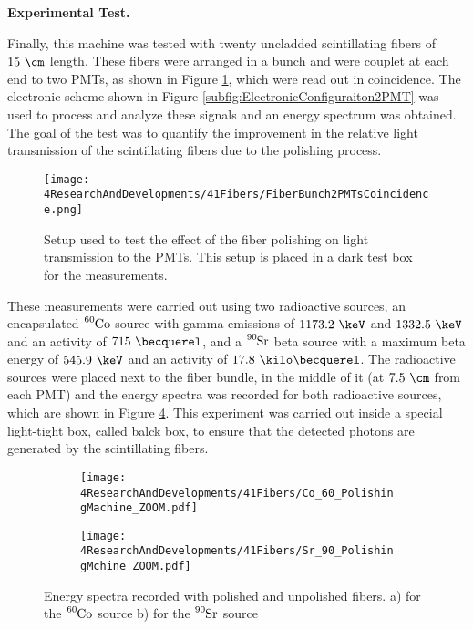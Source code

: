 \textbf{Experimental Test.}

Finally, this machine was tested with twenty uncladded scintillating fibers of $15~\cm$ length. These fibers were arranged in a bunch and were couplet at each end to two PMTs, as shown in Figure \ref{fig:BunchWith2PMTsCoincidence}, which were read out in coincidence. The electronic scheme shown in Figure \ref{subfig:ElectronicConfiguraiton2PMT} was used to process and analyze these signals and an energy spectrum was obtained. The goal of the test was to quantify the improvement in the relative light transmission of the scintillating fibers due to the polishing process.

\begin{figure}[]
\centering
\texttt{[image: 4ResearchAndDevelopments/41Fibers/FiberBunch2PMTsCoincidence.png]}
\caption{Setup used to test the effect of the fiber polishing on light transmission to the PMTs. This setup is placed in a dark test box for the measurements.\label{fig:BunchWith2PMTsCoincidence}}
\end{figure}

These measurements were carried out using two radioactive sources, an encapsulated $\ce{^{60}Co}$ source with gamma emissions of $1173.2~\keV$ and $1332.5~\keV$ and an activity of $715~\becquerel$, and a $\ce{^{90}Sr}$ beta source with a maximum beta energy of $545.9~\keV$ and an activity of $17.8~\kilo\becquerel$. The radioactive sources were placed next to the fiber bundle, in the middle of it (at $7.5~\cm$ from each PMT) and the energy spectra was recorded for both radioactive sources, which are shown in Figure \ref{fig:ResultsOfPolishingMachine}. This experiment was carried out inside a special light-tight box, called balck box, to ensure that the detected photons are generated by the scintillating fibers.

\begin{figure}
\centering
    \begin{subfigure}[b]{1\textwidth}
    \centering
    \texttt{[image: 4ResearchAndDevelopments/41Fibers/Co\_60\_PolishingMachine\_ZOOM.pdf]}  
    \caption{\label{subfig:EnergySpectrumCo60PolishingTest}}
    \end{subfigure}
    \hfill
    \begin{subfigure}[b]{1\textwidth}
    \centering
    \texttt{[image: 4ResearchAndDevelopments/41Fibers/Sr\_90\_PolishingMchine\_ZOOM.pdf]}  
    \caption{\label{subfig:EnergySpectrumSr90PolishingTest}}
    \end{subfigure}
 \caption{Energy spectra recorded with polished and unpolished fibers. a) for the $\ce{^{60}Co}$ source b) for the $\ce{^{90}Sr}$ source}
 \label{fig:ResultsOfPolishingMachine}
\end{figure}

